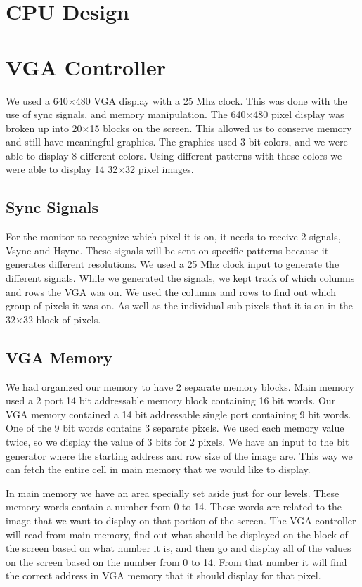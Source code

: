 \documentclass{article}
\begin{document}
\section{CPU Design}

\section{VGA Controller}
We used a 640$\times$480 VGA display with a 25 Mhz clock. This was done with the use of sync signals, and memory manipulation. The 640$\times$480 pixel display was broken up into 20$\times$15 blocks on the screen. This allowed us to conserve memory and still have meaningful graphics.  The graphics used 3 bit colors, and we were able to display 8 different colors. Using different patterns with these colors we were able to display 14 32$\times$32 pixel images.

\subsection{Sync Signals}
For the monitor to recognize which pixel it is on, it needs to receive 2 signals, Vsync and Hsync.  These signals will be sent on specific patterns because it generates different resolutions. We used a 25 Mhz clock input to generate the different signals. While we generated the signals, we kept track of which columns and rows the VGA was on. We used the columns and rows to find out which group of pixels it was on.  As well as the individual sub pixels that it is on in the 32$\times$32 block of pixels.

\subsection{VGA Memory}
We had organized our memory to have 2 separate memory blocks.  Main memory used a 2 port 14 bit addressable memory block containing 16 bit words. Our VGA memory contained a 14 bit addressable single port containing 9 bit words.  One of the 9 bit words contains 3 separate pixels.   We used each memory value twice, so we display the value of 3 bits for 2 pixels. We have an input to the bit generator where the starting address and row size of the image are.  This way we can fetch the entire cell in main memory that we would like to display.

In main memory we have an area specially set aside just for our levels.  These memory words contain a number from 0 to 14.  These words are related to the image that we want to display on that portion of the screen.  The VGA controller will read from main memory, find out what should be displayed on the block of the screen based on what number it is, and then go and display all of the values on the screen based on the number from 0 to 14.  From that number it will find the correct address in VGA memory that it should display for that pixel. 
 
\end{document}
